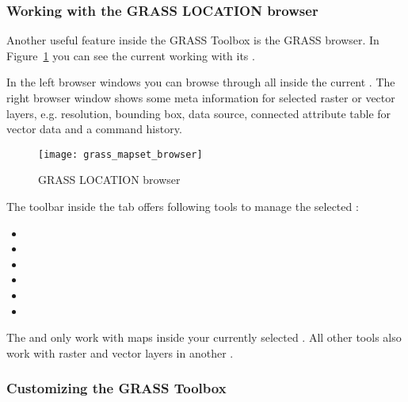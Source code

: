 \subsubsection{Working with the GRASS LOCATION browser} 

Another useful feature inside the GRASS Toolbox is the GRASS 
 browser. In Figure~\ref{fig:grass_mapset_browser} you 
can see the current working  with its .

In the left browser windows you can browse through all  
inside the current . The right browser window shows some 
meta information for selected raster or vector layers, e.g. resolution, 
bounding box, data source, connected attribute table for vector data and a 
command history.

\begin{figure}[h]
 \begin{center}
 \caption{GRASS LOCATION browser \nixcaption}\label{fig:grass_mapset_browser}
 \texttt{[image: grass\_mapset\_browser]}
 \end{center}
\end{figure}

The toolbar inside the  tab offers following tools to manage 
the selected :

\begin{itemize}
\item {}
\item {}
\item {}
\item {}
\item {}
\item {}
\end{itemize}

The  and 
 only work with maps inside 
your currently selected . All other tools also work with 
raster and vector layers in another .

\subsubsection{Customizing the GRASS Toolbox} 
\label{sec:toolbox-customizing}

